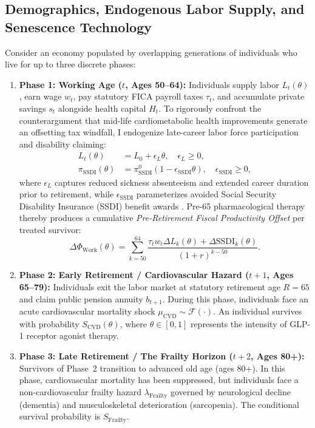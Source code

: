 \documentclass[11pt,a4paper]{article}
\begin{document}
\subsection{Demographics, Endogenous Labor Supply, and Senescence Technology}
Consider an economy populated by overlapping generations of individuals who live for up to three discrete phases:
\begin{enumerate}
    \item \textbf{Phase 1: Working Age ($t$, Ages 50--64):} Individuals supply labor $L_t(\theta)$, earn wage $w_t$, pay statutory FICA payroll taxes $\tau_t$, and accumulate private savings $s_t$ alongside health capital $H_t$. To rigorously confront the counterargument that mid-life cardiometabolic health improvements generate an offsetting tax windfall, I endogenize late-career labor force participation and disability claiming:
    \begin{align}
        L_t(\theta) &= L_0 + \epsilon_L \theta, \quad \epsilon_L \ge 0, \label{eq:labor_supply} \\
        \pi_{\text{SSDI}}(\theta) &= \pi_{\text{SSDI}}^0 (1 - \epsilon_{\text{SSDI}} \theta), \quad \epsilon_{\text{SSDI}} \ge 0, \label{eq:ssdi_claims}
    \end{align}
    where $\epsilon_L$ captures reduced sickness absenteeism and extended career duration prior to retirement, while $\epsilon_{\text{SSDI}}$ parameterizes avoided Social Security Disability Insurance (SSDI) benefit awards \citep{autor2014disability,french2014effect}. Pre-65 pharmacological therapy thereby produces a cumulative \textit{Pre-Retirement Fiscal Productivity Offset} per treated survivor:
    \begin{equation}
        \Delta \Phi_{\text{Work}}(\theta) = \sum_{k=50}^{64} \frac{\tau_t w_t \Delta L_k(\theta) + \Delta \text{SSDI}_k(\theta)}{(1+r)^{k-50}}.
        \label{eq:productivity_offset}
    \end{equation}
    \item \textbf{Phase 2: Early Retirement / Cardiovascular Hazard ($t+1$, Ages 65--79):} Individuals exit the labor market at statutory retirement age $R = 65$ and claim public pension annuity $b_{t+1}$. During this phase, individuals face an acute cardiovascular mortality shock $\mu_{\text{CVD}} \sim \mathcal{F}(\cdot)$. An individual survives with probability $S_{\text{CVD}}(\theta)$, where $\theta \in [0, 1]$ represents the intensity of GLP-1 receptor agonist therapy.
    \item \textbf{Phase 3: Late Retirement / The Frailty Horizon ($t+2$, Ages 80+):} Survivors of Phase~2 transition to advanced old age (ages 80+). In this phase, cardiovascular mortality has been suppressed, but individuals face a non-cardiovascular frailty hazard $\lambda_{\text{Frailty}}$ governed by neurological decline (dementia) and musculoskeletal deterioration (sarcopenia). The conditional survival probability is $S_{\text{Frailty}}$.
\end{enumerate}
\end{document}
